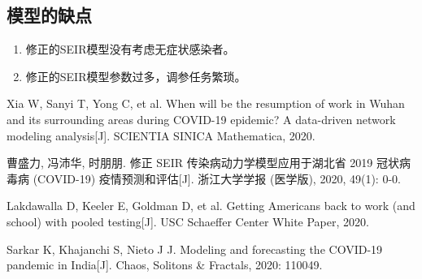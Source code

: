 \documentclass[withoutpre]{cumcmthesis} %
\begin{document}
\subsection{模型的缺点}
\begin{enumerate}
    \item 修正的SEIR模型没有考虑无症状感染者。
    \item 修正的SEIR模型参数过多，调参任务繁琐。
\end{enumerate}


\begin{thebibliography}{9}%

    Xia W, Sanyi T, Yong C, et al.
    \newblock  When will be the resumption of work in Wuhan and its surrounding areas during COVID-19 epidemic? A data-driven network modeling analysis[J]. SCIENTIA SINICA Mathematica, 2020.

    曹盛力, 冯沛华, 时朋朋. 
    \newblock 修正 SEIR 传染病动力学模型应用于湖北省 2019 冠状病毒病 (COVID-19) 疫情预测和评估[J]. 浙江大学学报 (医学版), 2020, 49(1): 0-0.

    Lakdawalla D, Keeler E, Goldman D, et al. 
    \newblock Getting Americans back to work (and school) with pooled testing[J]. USC Schaeffer Center White Paper, 2020.
    
    Sarkar K, Khajanchi S, Nieto J J. 
    \newblock Modeling and forecasting the COVID-19 pandemic in India[J]. Chaos, Solitons \& Fractals, 2020: 110049.

\end{thebibliography}
\end{document}

